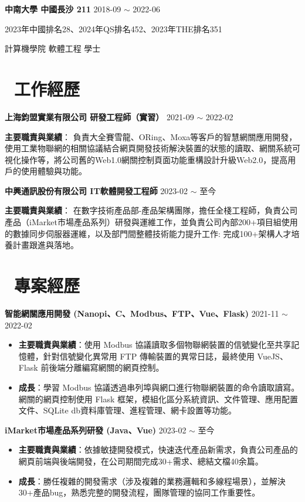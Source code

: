 \documentclass[10pt, a4paper]{article}
\begin{document}
\textbf{中南大學 \quad 中國長沙  211} \hfill 2018-09 $\sim$ 2022-06

2023年中國排名28、2024年QS排名452、2023年THE排名351

計算機學院 \quad 軟體工程 \quad 學士

\section{\color{CVBlue}\faBriefcase\ 工作經歷}

\textbf{上海鈞盟實業有限公司 \quad 研發工程師（實習）} \hfill 2021-09 $\sim$ 2022-02

\textbf{主要職責與業績}： \quad 負責大全賽雪龍、ORing、Moxa等客戶的智慧網關應用開發，使用工業物聯網的相關協議結合網頁開發技術解決裝置的狀態的讀取、網關系統可視化操作等，將公司舊的Web1.0網關控制頁面功能重構設計升級Web2.0，提高用戶的使用體驗與功能。

\textbf{中興通訊股份有限公司 \quad IT軟體開發工程師} \hfill 2023-02 $\sim$ 至今

\textbf{主要職責與業績}： \quad 在數字技術產品部-產品架構團隊，擔任全棧工程師，負責公司產品（iMarket市場產品系列）研發與運維工作，並負責公司內部200+項目組使用的數據同步伺服器運維，以及部門間整體技術能力提升工作:
完成100+架構人才培養計畫跟進與落地。


\section{\color{CVBlue}\faUsers\ 專案經歷}

\textbf{智能網關應用開發 (Nanopi、C、Modbus、FTP、Vue、Flask)} \hfill 2021-11 $\sim$ 2022-02

\begin{itemize}[parsep=0.5ex]
\item \textbf{主要職責與業績}：使用 Modbus 協議讀取多個物聯網裝置的信號變化至共享記憶體，針對信號變化異常用 FTP 傳輸裝置的異常日誌，最終使用 VueJS、Flask 前後端分離編寫網關的網頁控制。

\item \textbf{成長}：學習 Modbus 協議透過串列埠與網口進行物聯網裝置的命令讀取讀寫。網關的網頁控制使用 Flask 框架，模組化區分系統資訊、文件管理、應用配置文件、SQLite db資料庫管理、進程管理、網卡設置等功能。
\end{itemize}

\textbf{iMarket市場產品系列研發 (Java、Vue)} \hfill 2023-02 $\sim$ 至今

\begin{itemize}[parsep=0.5ex]
\item \textbf{主要職責與業績}：依據敏捷開發模式，快速迭代產品新需求，負責公司產品的網頁前端與後端開發，在公司期間完成30+需求、總結文檔40余篇。

\item \textbf{成長}：勝任複雜的開發需求（涉及複雜的業務邏輯和多線程場景），並解決30+產品bug，熟悉完整的開發流程，團隊管理的協同工作重要性。
\end{itemize}
\end{document}
